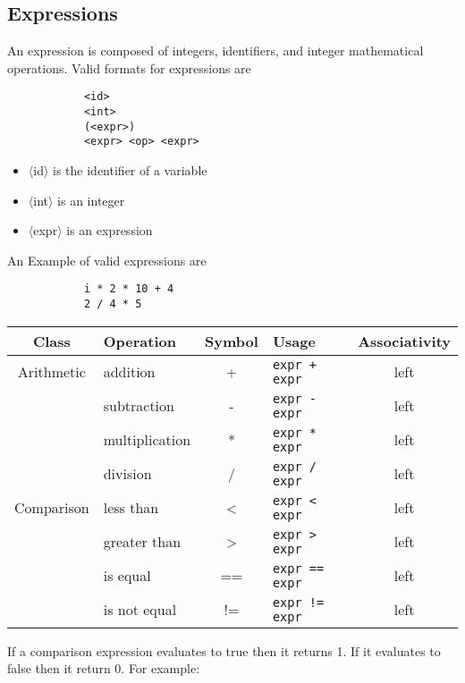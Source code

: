 \documentclass{article}
\begin{document}
	\subsection{Expressions}

		An expression is composed of integers, identifiers, and integer mathematical operations.  Valid formats for
		expressions are

		\begin{lstlisting}
			<id>
			<int>
			(<expr>)
			<expr> <op> <expr>
		\end{lstlisting}

		\begin{itemize}
			\item{$\langle$id$\rangle$} is the identifier of a variable
			\item{$\langle$int$\rangle$} is an integer
			\item{$\langle$expr$\rangle$} is an expression
		\end{itemize}

		An Example of valid expressions are

		\begin{lstlisting}
			i * 2 * 10 + 4
			2 / 4 * 5
		\end{lstlisting}

		\begin{center}
			\begin{tabular}{|c|l|c|l|c|}
				\hline
				\textbf{Class} & \textbf{Operation} & \textbf{Symbol} & \textbf{Usage} &
				\textbf{Associativity} \\
				\hline
				Arithmetic
				&addition	    & + & \texttt{expr + expr} & left \\
				&subtraction    & - & \texttt{expr - expr} & left \\
				&multiplication & * & \texttt{expr * expr} & left \\
				&division       & / & \texttt{expr / expr} & left \\
				\hline
				Comparison
				&less than      & <  & \texttt{expr < expr}  & left \\
				&greater than   & >  & \texttt{expr > expr}  & left \\
				&is equal       & == & \texttt{expr == expr} & left \\
				&is not equal   & != & \texttt{expr != expr} & left \\
				\hline
			\end{tabular}
		\end{center}

		If a comparison expression evaluates to true then it returns 1. If it evaluates to false then it
		return 0. For example:
\end{document}
